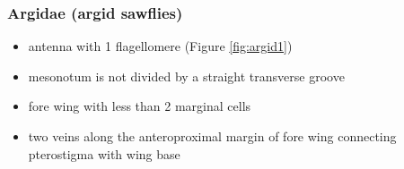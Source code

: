 \documentclass[letterpaper, 11pt]{article}
\begin{document}
\subsubsection{Argidae (argid sawflies)}
\begin{itemize}
\item antenna with 1 flagellomere (Figure \ref{fig:argid1})
\item mesonotum is not divided by a straight transverse groove
\item fore wing with less than 2 marginal cells
\item two veins along the anteroproximal margin of fore wing connecting pterostigma with wing base
\end{itemize}

\begin{figure}[ht!]
    \centering
    \begin{subfigure}[ht!]{0.11\textwidth}

\end{subfigure}
\end{figure}
\end{document}
